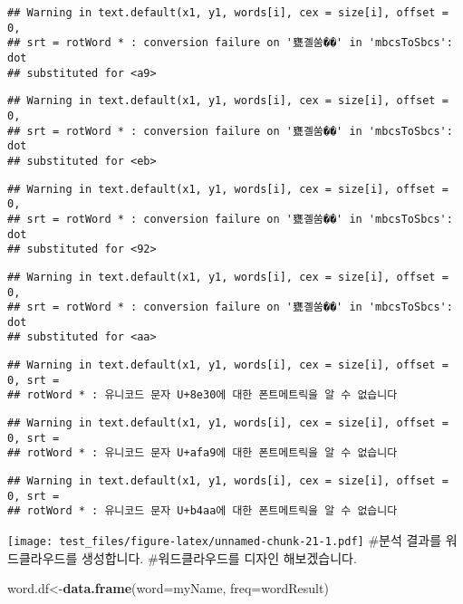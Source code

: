 \documentclass[]{article}
\newenvironment{Shaded}{\begin{snugshade}}{\end{snugshade}}
\newcommand{\KeywordTok}[1]{\textcolor[rgb]{0.13,0.29,0.53}{\textbf{#1}}}
\newcommand{\DataTypeTok}[1]{\textcolor[rgb]{0.13,0.29,0.53}{#1}}
\newcommand{\NormalTok}[1]{#1}
\begin{document}
\begin{verbatim}
## Warning in text.default(x1, y1, words[i], cex = size[i], offset = 0,
## srt = rotWord * : conversion failure on '甕곌쑴��' in 'mbcsToSbcs': dot
## substituted for <a9>
\end{verbatim}

\begin{verbatim}
## Warning in text.default(x1, y1, words[i], cex = size[i], offset = 0,
## srt = rotWord * : conversion failure on '甕곌쑴��' in 'mbcsToSbcs': dot
## substituted for <eb>
\end{verbatim}

\begin{verbatim}
## Warning in text.default(x1, y1, words[i], cex = size[i], offset = 0,
## srt = rotWord * : conversion failure on '甕곌쑴��' in 'mbcsToSbcs': dot
## substituted for <92>
\end{verbatim}

\begin{verbatim}
## Warning in text.default(x1, y1, words[i], cex = size[i], offset = 0,
## srt = rotWord * : conversion failure on '甕곌쑴��' in 'mbcsToSbcs': dot
## substituted for <aa>
\end{verbatim}

\begin{verbatim}
## Warning in text.default(x1, y1, words[i], cex = size[i], offset = 0, srt =
## rotWord * : 유니코드 문자 U+8e30에 대한 폰트메트릭을 알 수 없습니다
\end{verbatim}

\begin{verbatim}
## Warning in text.default(x1, y1, words[i], cex = size[i], offset = 0, srt =
## rotWord * : 유니코드 문자 U+afa9에 대한 폰트메트릭을 알 수 없습니다
\end{verbatim}

\begin{verbatim}
## Warning in text.default(x1, y1, words[i], cex = size[i], offset = 0, srt =
## rotWord * : 유니코드 문자 U+b4aa에 대한 폰트메트릭을 알 수 없습니다
\end{verbatim}

\texttt{[image: test\_files/figure-latex/unnamed-chunk-21-1.pdf]} \#분석
결과를 워드클라우드를 생성합니다. \#워드클라우드를 디자인 해보겠습니다.

\begin{Shaded}
\begin{Highlighting}[]
\NormalTok{word.df<-}\KeywordTok{data.frame}\NormalTok{(}\DataTypeTok{word=}\NormalTok{myName, }\DataTypeTok{freq=}\NormalTok{wordResult)}
\end{Highlighting}
\end{Shaded}
\end{document}
